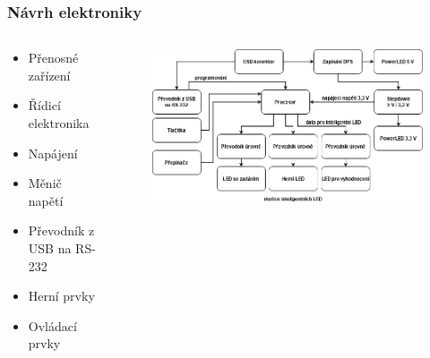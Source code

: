 \documentclass[%
  12pt,       				%
	t,                  %
	aspectratio=1610,   %
	unicode,						%
]{beamer}				    	%
\begin{document}


\begin{frame} 
	\frametitle{Návrh elektroniky}
	
	\begin{columns}[T] 								%
		\begin{column}{0.45\textwidth}		%
			\vspace{0.5cm}
			\begin{itemize}
				\item Přenosné zařízení
				\item Řídicí elektronika
				\item Napájení
				\item Měnič napětí
				\item Převodník z USB na RS-232
				\item Herní prvky
				\item Ovládací prvky
			\end{itemize}
		\end{column}
		\begin{column}{0.55\textwidth}		%
			\begin{figure}%
				\centering
				\vspace{1cm}	              %
				\includegraphics[width=1\columnwidth]{obrazky/v2_blokove_schema.jpg}
			\end{figure}
		\end{column}
	\end{columns}											%
\end{frame}
\end{document}
